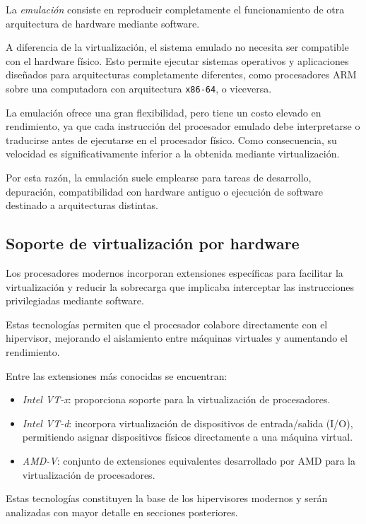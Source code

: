 La \textit{emulación} consiste en reproducir completamente el funcionamiento de otra arquitectura de hardware mediante software.

A diferencia de la virtualización, el sistema emulado no necesita ser compatible con el hardware físico. Esto permite ejecutar sistemas operativos y aplicaciones diseñados para arquitecturas completamente diferentes, como procesadores ARM sobre una computadora con arquitectura \texttt{x86-64}, o viceversa.

La emulación ofrece una gran flexibilidad, pero tiene un costo elevado en rendimiento, ya que cada instrucción del procesador emulado debe interpretarse o traducirse antes de ejecutarse en el procesador físico. Como consecuencia, su velocidad es significativamente inferior a la obtenida mediante virtualización.

Por esta razón, la emulación suele emplearse para tareas de desarrollo, depuración, compatibilidad con hardware antiguo o ejecución de software destinado a arquitecturas distintas.

\subsection{Soporte de virtualización por hardware}

Los procesadores modernos incorporan extensiones específicas para facilitar la virtualización y reducir la sobrecarga que implicaba interceptar las instrucciones privilegiadas mediante software.

Estas tecnologías permiten que el procesador colabore directamente con el hipervisor, mejorando el aislamiento entre máquinas virtuales y aumentando el rendimiento.

Entre las extensiones más conocidas se encuentran:
\begin{itemize}
  \item \textit{Intel VT-x}: proporciona soporte para la virtualización de procesadores.
  \item \textit{Intel VT-d}: incorpora virtualización de dispositivos de entrada/salida (I/O), permitiendo asignar dispositivos físicos directamente a una máquina virtual.
  \item \textit{AMD-V}: conjunto de extensiones equivalentes desarrollado por AMD para la virtualización de procesadores.
\end{itemize}
Estas tecnologías constituyen la base de los hipervisores modernos y serán analizadas con mayor detalle en secciones posteriores.

